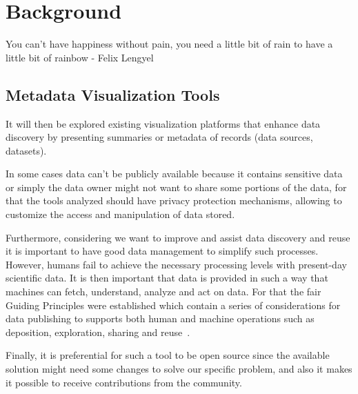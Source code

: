 \chapter{Background}
\label{chapter:background}
\graphicspath{{figs/02-background/}}

\begin{introduction}
    You can't have happiness without pain, you need a little bit of rain to have a little bit of rainbow - Felix Lengyel
\end{introduction}

\section{Metadata Visualization Tools} \label{sec:viz-tools}


It will then be explored existing visualization platforms that enhance data discovery
by presenting summaries or metadata of records (data sources, datasets).

In some cases data can't be publicly available because it contains sensitive data or
simply the data owner might not want to share some portions of the data, for that the
tools analyzed should have privacy protection mechanisms, allowing to customize the
access and manipulation of data stored.

Furthermore, considering we want to improve and assist data discovery and reuse it is
important to have good data management to simplify such processes.
However, humans fail to achieve the necessary processing levels with present-day
scientific data.
It is then important that data is provided in such a way that machines can fetch,
understand, analyze and act on data.
For that the \gls{fair} Guiding Principles were established which contain a series of
considerations for data publishing to supports both human and machine operations such
as deposition, exploration, sharing and reuse~\cite{fair}.


Finally, it is preferential for such a tool to be open source since the available
solution might need some changes to solve our specific problem, and also it makes it
possible to receive contributions from the community.

